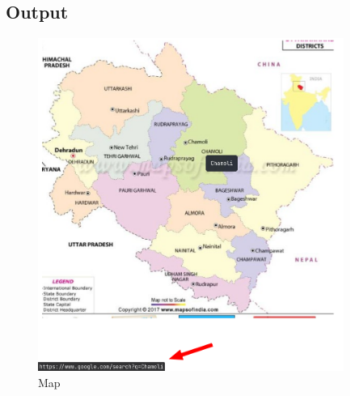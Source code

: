 \documentclass{extarticle}
\begin{document}
\newpage


\newpage
\subsection*{Output}
\begin{figure}[H]
    \caption{Map}
    \centering
    \includegraphics[width=10cm]{5/5.png}
\end{figure}
\end{document}
